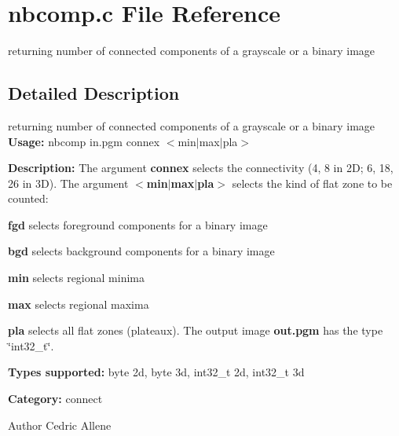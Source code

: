 \section{nbcomp.c File Reference}
\label{nbcomp_8c}


returning number of connected components of a grayscale or a binary image  




\subsection{Detailed Description}
returning number of connected components of a grayscale or a binary image {\bfseries Usage:} nbcomp in.pgm connex $<$min$|$max$|$pla$>$

{\bfseries Description:} The argument {\bfseries connex} selects the connectivity (4, 8 in 2D; 6, 18, 26 in 3D). The argument {\bfseries $<$min$|$max$|$pla$>$} selects the kind of flat zone to be counted: \begin{DoxyItemize}
\item {\bfseries fgd} selects foreground components for a binary image \item {\bfseries bgd} selects background components for a binary image \item {\bfseries min} selects regional minima \item {\bfseries max} selects regional maxima \item {\bfseries pla} selects all flat zones (plateaux). The output image {\bfseries out.pgm} has the type \char`\"{}int32\_\-t\char`\"{}.\end{DoxyItemize}
{\bfseries Types supported:} byte 2d, byte 3d, int32\_\-t 2d, int32\_\-t 3d

{\bfseries Category:} connect

\begin{DoxyAuthor}{Author}
Cedric Allene 
\end{DoxyAuthor}
